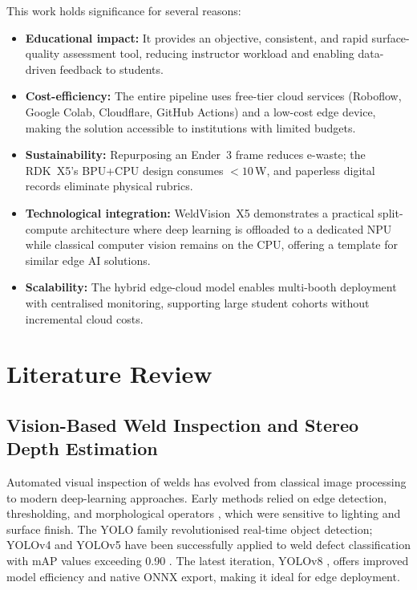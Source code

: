 \documentclass[12pt,a4paper]{article}
\begin{document}
This work holds significance for several reasons:
\begin{itemize}[leftmargin=*, itemsep=3pt]
  \item \textbf{Educational impact:} It provides an objective, consistent, and rapid surface-quality
        assessment tool, reducing instructor workload and enabling data-driven feedback to students.
  \item \textbf{Cost-efficiency:} The entire pipeline uses free-tier cloud services (Roboflow, Google Colab,
        Cloudflare, GitHub Actions) and a low-cost edge device, making the solution accessible to institutions
        with limited budgets.
  \item \textbf{Sustainability:} Repurposing an Ender~3 frame reduces e-waste; the RDK~X5's BPU+CPU design
        consumes $<10$\,W, and paperless digital records eliminate physical rubrics.
  \item \textbf{Technological integration:} WeldVision~X5 demonstrates a practical split-compute architecture
        where deep learning is offloaded to a dedicated NPU while classical computer vision remains on the CPU,
        offering a template for similar edge AI solutions.
  \item \textbf{Scalability:} The hybrid edge-cloud model enables multi-booth deployment with centralised
        monitoring, supporting large student cohorts without incremental cloud costs.
\end{itemize}

\section{Literature Review}

\subsection{Vision-Based Weld Inspection and Stereo Depth Estimation}

Automated visual inspection of welds has evolved from classical image processing to modern deep-learning
approaches. Early methods relied on edge detection, thresholding, and morphological operators \cite{Kumar2019},
which were sensitive to lighting and surface finish. The YOLO family \cite{Redmon2018} revolutionised
real-time object detection; YOLOv4 and YOLOv5 have been successfully applied to weld defect classification
with mAP values exceeding 0.90 \cite{Zhang2020,He2022}. The latest iteration, YOLOv8 \cite{Jocher2023},
offers improved model efficiency and native ONNX export, making it ideal for edge deployment.
\end{document}
